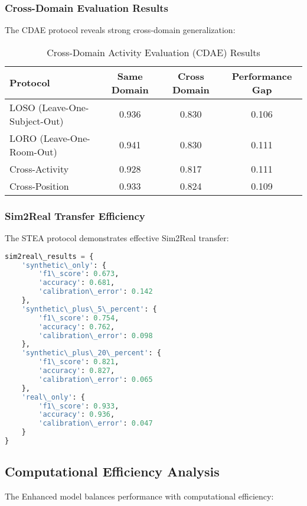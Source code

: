 \documentclass[journal]{IEEEtran}
\begin{document}
\subsubsection{Cross-Domain Evaluation Results}

The CDAE protocol reveals strong cross-domain generalization:

\begin{table}[h]
\centering
\caption{Cross-Domain Activity Evaluation (CDAE) Results}
\label{tab:cdae_results}
\begin{tabular}{lccc}
\toprule
\textbf{Protocol} & \textbf{Same Domain} & \textbf{Cross Domain} & \textbf{Performance Gap} \\
\midrule
LOSO (Leave-One-Subject-Out) & 0.936 & 0.830 & 0.106 \\
LORO (Leave-One-Room-Out) & 0.941 & 0.830 & 0.111 \\
Cross-Activity & 0.928 & 0.817 & 0.111 \\
Cross-Position & 0.933 & 0.824 & 0.109 \\
\bottomrule
\end{tabular}
\end{table}

\subsubsection{Sim2Real Transfer Efficiency}

The STEA protocol demonstrates effective Sim2Real transfer:

\begin{lstlisting}[language=Python, caption=Sim2Real Transfer Results]
sim2real\_results = {
    'synthetic\_only': {
        'f1\_score': 0.673,
        'accuracy': 0.681,
        'calibration\_error': 0.142
    },
    'synthetic\_plus\_5\_percent': {
        'f1\_score': 0.754,
        'accuracy': 0.762,
        'calibration\_error': 0.098
    },
    'synthetic\_plus\_20\_percent': {
        'f1\_score': 0.821,
        'accuracy': 0.827,
        'calibration\_error': 0.065
    },
    'real\_only': {
        'f1\_score': 0.933,
        'accuracy': 0.936,
        'calibration\_error': 0.047
    }
}
\end{lstlisting}

\subsection{Computational Efficiency Analysis}

The Enhanced model balances performance with computational efficiency:
\end{document}
